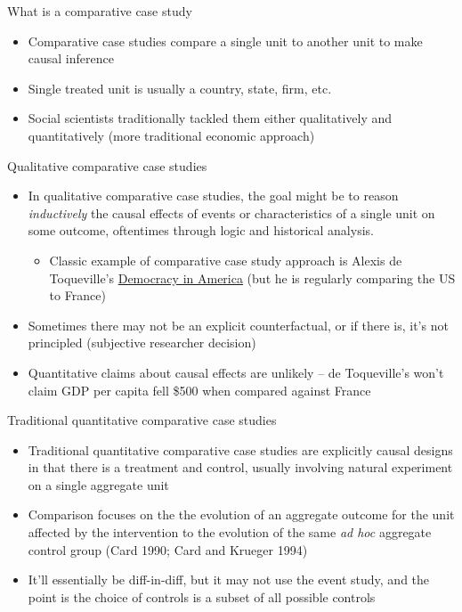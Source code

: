 \documentclass{beamer}
\begin{document}
\begin{frame}{What is a comparative case study}

\begin{itemize}
\item Comparative case studies compare a single unit to another unit to make causal inference
\item Single treated unit is usually a country, state, firm, etc.
\item Social scientists traditionally tackled them either qualitatively and quantitatively (more traditional economic approach)
\end{itemize}

\end{frame}


\begin{frame}{Qualitative comparative case studies}
	
	\begin{itemize}
	\item In qualitative comparative case studies, the goal might be to reason \emph{inductively} the causal effects of events or characteristics of a single unit on some outcome, oftentimes through logic and historical analysis.  
		\begin{itemize}
		\item Classic example of comparative case study approach is Alexis de Toqueville's \underline{Democracy in America} (but he is regularly comparing the US to France)
		\end{itemize}
	\item Sometimes there may not be an explicit counterfactual, or if there is, it's not principled (subjective researcher decision)
	\item Quantitative claims about causal effects are unlikely -- de Toqueville's won't claim GDP per capita fell \$500 when compared against France
	\end{itemize}
\end{frame}

\begin{frame}{Traditional quantitative comparative case studies}

\begin{itemize}
	\item Traditional quantitative comparative case studies are explicitly causal designs in that there is a treatment and control, usually involving natural experiment on a single aggregate unit
	\item Comparison focuses on the the evolution of an aggregate outcome for the unit affected by the intervention to the evolution of the same \emph{ad hoc} aggregate control group (Card 1990; Card and Krueger 1994)
	\item It'll essentially be diff-in-diff, but it may not use the event study, and the point is the choice of controls is a subset of all possible controls
\end{itemize}

\end{frame}
\end{document}
